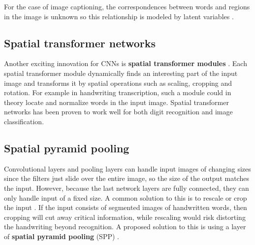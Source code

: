 For the case of image captioning, the correspondences between words and regions in the image is unknown so this relationship is modeled by latent variables \cite{VisualSemanticAlignment}.

\subsection{Spatial transformer networks}

Another exciting innovation for CNNs is \textbf{spatial transformer modules} \cite{SpatialTransformerNetworks}. Each spatial transformer module dynamically finds an interesting part of the input image and transforms it by spatial operations such as scaling, cropping and rotation. For example in handwriting transcription, such a module could in theory locate and normalize words in the input image. Spatial transformer networks has been proven to work well for both digit recognition and image classification.

\subsection{Spatial pyramid pooling}

Convolutional layers and pooling layers can handle input images of changing sizes since the filters just slide over the entire image, so the size of the output matches the input.
However, because the last network layers are fully connected, they can only handle input of a fixed size. A common solution to this is to rescale or crop the input \cite{FornesCnnCategorization}. If the input consists of segmented images of handwritten words, then cropping will cut away critical information, while rescaling would risk distorting the handwriting beyond recognition. A proposed solution to this is using a layer of \textbf{spatial pyramid pooling} (SPP) \cite{FornesCnnCategorization}.


